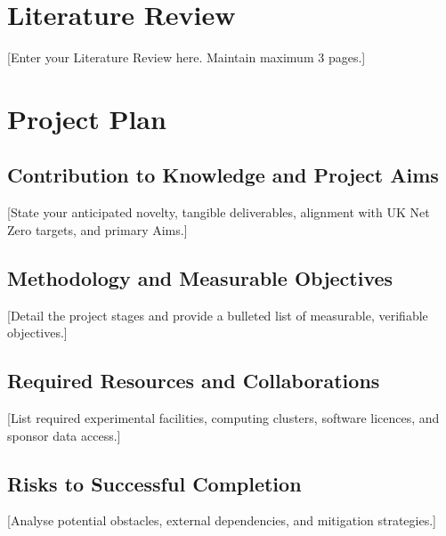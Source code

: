 \documentclass[year1,hideguidance]{idcore-ar}
\author{Jane Doe}
\begin{document}
\makecoverpage

\section{Literature Review}

[Enter your Literature Review here. Maintain maximum 3 pages.]


\section{Project Plan}

\subsection{Contribution to Knowledge and Project Aims}
[State your anticipated novelty, tangible deliverables, alignment with UK Net Zero targets, and primary Aims.]

\subsection{Methodology and Measurable Objectives}
[Detail the project stages and provide a bulleted list of measurable, verifiable objectives.]

\subsection{Required Resources and Collaborations}
[List required experimental facilities, computing clusters, software licences, and sponsor data access.]

\subsection{Risks to Successful Completion}
[Analyse potential obstacles, external dependencies, and mitigation strategies.]


\newpage
\end{document}
